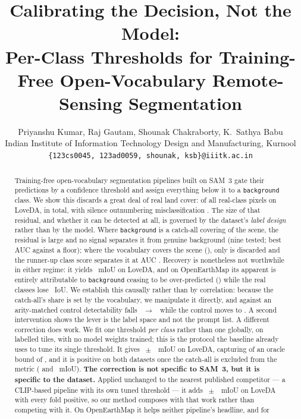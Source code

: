 \documentclass[10pt,a4paper]{article}                        %
\title{Calibrating the Decision, Not the Model:\\
       Per-Class Thresholds for Training-Free Open-Vocabulary
       Remote-Sensing Segmentation}
\author{%
  Priyanshu Kumar, \quad Raj Gautam, \quad Shounak Chakraborty, \quad K.~Sathya Babu\\[2pt]
  Indian Institute of Information Technology Design and Manufacturing, Kurnool\\
  \texttt{\{123cs0045, 123ad0059, shounak, ksb\}@iiitk.ac.in}%
}
\date{}
\newcommand{\best}[1]{\textbf{#1}}
\newcommand{\bg}{\texttt{background}}
\begin{document}
\maketitle

\begin{abstract}
Training-free open-vocabulary segmentation pipelines built on SAM~3 gate their
predictions by a confidence threshold and assign everything below it to a
\bg{} class. We show this discards a great deal of real land cover: \discardPct{} of all
real-class pixels on LoveDA, \discardPx{} in total, with silence outnumbering
misclassification \discardRatio{}. The size of that residual, and whether it can
be detected at all, is governed by the dataset's \emph{label design} rather than
by the model. Where \bg{} is a
catch-all covering \bgShareLove{} of the scene, the residual is large and no
signal separates it from genuine background (nine tested; best AUC \aucLove{}
against a \aucFloor{} floor); where the vocabulary covers the scene
(\bgShareOEM{}), only \discardOEM{} is discarded and the runner-up class score
separates it at AUC \aucOEM{}. Recovery is nonetheless not worthwhile in either
regime: it yields \recoverLove{}~mIoU on LoveDA, and on OpenEarthMap its
apparent \recoverOEM{} is entirely attributable to \bg{} ceasing to be
over-predicted (\oemBgGain{}) while the real classes lose \oemRealLoss{}~IoU.
We establish this causally rather than by correlation: because the catch-all's
share is set by the vocabulary, we manipulate it directly, and against an
arity-matched control detectability falls \ivAtwo{}~$\to$~\ivBtwo{} while the
control moves to \ivDtwo{}. A second intervention shows the lever is the label
space and not the prompt list.
A different correction does work. We fit one threshold \emph{per class} rather
than one globally, on \calibTiles{} labelled tiles, with no model weights trained;
this is the protocol the baseline already uses to tune its single threshold. It
gives \methodGain{}~$\pm$~\methodSD{}~mIoU on LoveDA, capturing
\oracleShare{} of an oracle bound of \oracleBound{}, and it is positive on both
datasets once the catch-all is excluded from the metric (\mrLoveReal{} and
\mrOemReal{}~mIoU). \best{The correction is not specific to SAM~3, but it is specific to the
dataset.} Applied unchanged to the nearest published competitor --- a CLIP-based
pipeline with its own tuned threshold --- it adds \cnCV{}~$\pm$~\cnCVsd{}~mIoU on
LoveDA with every fold positive, so our method composes with that work rather than
competing with it. On OpenEarthMap it helps neither pipeline's headline, and for

\end{abstract}
\end{document}
